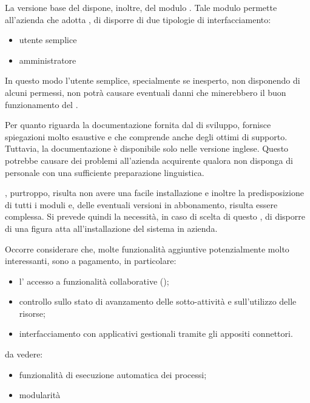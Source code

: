 La versione base del \sw dispone, inoltre, del modulo . Tale modulo permette all'azienda che adotta , di disporre di due tipologie di interfacciamento:
\begin{itemize}
 \item utente semplice
 \item amministratore
\end{itemize}

In questo modo l'utente semplice, specialmente se inesperto, non disponendo di alcuni permessi, non potrà causare eventuali danni che minerebbero il buon funzionamento del \sw.

Per quanto riguarda la documentazione fornita dal  di sviluppo, fornisce spiegazioni molto esaustive e  che comprende anche degli ottimi  di supporto. 
Tuttavia, la documentazione è disponibile solo nelle versione inglese. Questo potrebbe causare dei problemi all'azienda acquirente qualora non disponga di personale con una sufficiente preparazione linguistica.

, purtroppo, risulta non avere una facile installazione e inoltre la predisposizione di tutti i moduli e, delle eventuali versioni in abbonamento, risulta essere complessa. Si prevede quindi la necessità, in caso di scelta di questo \sw , di disporre di una figura atta all'installazione del sistema in azienda. 

Occorre considerare che, molte funzionalità aggiuntive potenzialmente molto interessanti, sono a pagamento, in particolare:
\begin{itemize}
\item l' accesso a funzionalità collaborative ();
\item controllo sullo stato di avanzamento delle sotto-attività e sull'utilizzo delle risorse;
\item interfacciamento con applicativi gestionali  tramite gli appositi connettori.

\end{itemize}


da vedere:
\begin{itemize}


 \item funzionalità di esecuzione automatica dei processi;
 \item modularità %

\end{itemize}

